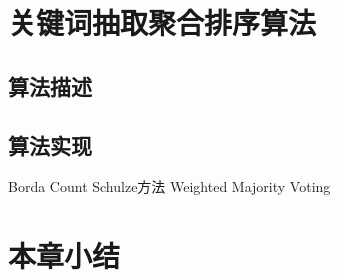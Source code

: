 \section{关键词抽取聚合排序算法}


\subsection{算法描述}
\subsection{算法实现}
Borda Count
Schulze方法
Weighted Majority Voting


\section{本章小结}



